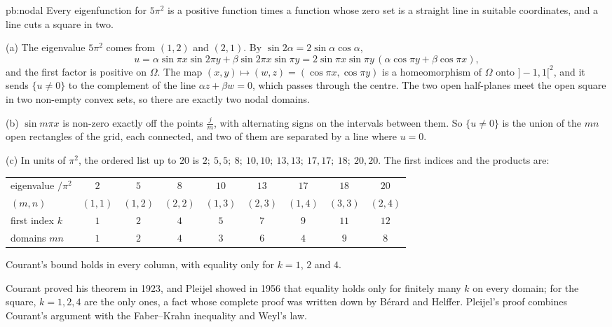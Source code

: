 \begin{solution}{pb:nodal}
\idea Every eigenfunction for $5\pi^2$ is a positive function times a function whose zero set is a straight line in suitable coordinates, and a line cuts a square in two.

\writeup (a) The eigenvalue $5\pi^2$ comes from $(1,2)$ and $(2,1)$. By $\sin2\alpha=2\sin\alpha\cos\alpha$,
\[
u=\alpha\sin\pi x\sin2\pi y+\beta\sin2\pi x\sin\pi y=2\sin\pi x\sin\pi y\,(\alpha\cos\pi y+\beta\cos\pi x),
\]
and the first factor is positive on $\Omega$. The map $(x,y)\mapsto(w,z)=(\cos\pi x,\cos\pi y)$ is a homeomorphism of $\Omega$ onto $]-1,1[^2$, and it sends $\{u\ne0\}$ to the complement of the line
$\alpha z+\beta w=0$, which passes through the centre. The two open half-planes meet the open square in two non-empty convex sets, so there are exactly two nodal domains.

(b) $\sin m\pi x$ is non-zero exactly off the points $\frac jm$, with alternating signs on the intervals between them. So $\{u\ne0\}$ is the union of the $mn$ open rectangles of the grid, each connected,
and two of them are separated by a line where $u=0$.

(c) In units of $\pi^2$, the ordered list up to $20$ is $2;\ 5,5;\ 8;\ 10,10;\ 13,13;\ 17,17;\ 18;\ 20,20$. The first indices and the products are:
\begin{center}
\begin{tabular}{lcccccccc}
\toprule
eigenvalue $/\pi^2$&$2$&$5$&$8$&$10$&$13$&$17$&$18$&$20$\\
$(m,n)$&$(1,1)$&$(1,2)$&$(2,2)$&$(1,3)$&$(2,3)$&$(1,4)$&$(3,3)$&$(2,4)$\\
first index $k$&$1$&$2$&$4$&$5$&$7$&$9$&$11$&$12$\\
domains $mn$&$1$&$2$&$4$&$3$&$6$&$4$&$9$&$8$\\
\bottomrule
\end{tabular}
\end{center}
Courant's bound holds in every column, with equality only for $k=1$, $2$ and $4$.

\leads Courant proved his theorem in 1923, and Pleijel showed in 1956 that equality holds only for finitely many $k$ on every domain; for the square, $k=1,2,4$ are the only ones, a fact whose complete proof was written down by Bérard and Helffer. Pleijel's
proof combines Courant's argument with the Faber--Krahn inequality and Weyl's law.
\end{solution}

